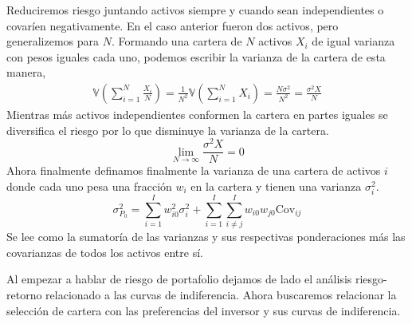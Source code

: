 Reduciremos riesgo juntando activos siempre y cuando sean independientes o covaríen negativamente. En el caso anterior fueron dos activos, pero generalizemos para $N$. Formando una cartera de $N$ activos $X_i$ de igual varianza con pesos iguales cada uno, podemos escribir la varianza de la cartera de esta manera,
\begin{align*}
    \mathbb{V} \left(\sum_{i =1}^{N} \frac{X_i}{N} \right) = \frac{1}{N^2}\mathbb{V} \left(\sum_{i = 1}^N X_i \right) = \frac{N\sigma^2}{N^2} = \frac{\sigma^2 X}{N}
\end{align*}
Mientras más activos independientes conformen la cartera en partes iguales se diversifica el riesgo por lo que disminuye la varianza de la cartera.
\begin{equation}
    \lim_{N \to \infty} \frac{\sigma^2 X}{N} = 0
\end{equation}
Ahora finalmente definamos finalmente la varianza de una cartera de activos $i$ donde cada uno pesa una fracción $w_i$ en la cartera y tienen una varianza $\sigma^2_i$. 
\begin{equation}
    \sigma_{P_0}^2 = \sum_{i = 1}^I w_{i0}^2\sigma_i^2 + \sum^I_{i = 1}\sum^I_{i \neq j} w_{i0}w_{j0}\text{Cov}_{ij}
\end{equation}
Se lee como la sumatoría de las varianzas y sus respectivas ponderaciones más las covarianzas de todos los activos entre sí.

Al empezar a hablar de riesgo de portafolio dejamos de lado el análisis riesgo-retorno relacionado a las curvas de indiferencia. Ahora buscaremos relacionar la selección de cartera con las preferencias del inversor y sus curvas de indiferencia.